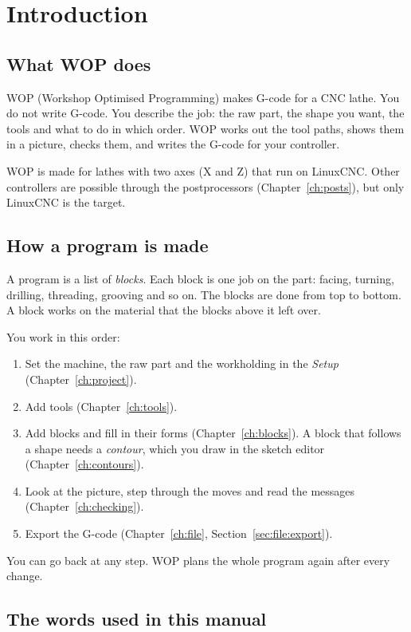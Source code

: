 \chapter{Introduction}\label{ch:introduction}

\section{What WOP does}
WOP (Workshop Optimised Programming) makes G-code for a CNC lathe. You do not write G-code. You describe the job: the raw part, the shape you want, the tools and what to do in which order. WOP works out the tool paths, shows them in a picture, checks them, and writes the G-code for your controller.

WOP is made for lathes with two axes (X and Z) that run on LinuxCNC. Other controllers are possible through the postprocessors (Chapter~\ref{ch:posts}), but only LinuxCNC is the target.

\section{How a program is made}
A program is a list of \emph{blocks}. Each block is one job on the part: facing, turning, drilling, threading, grooving and so on. The blocks are done from top to bottom. A block works on the material that the blocks above it left over.

You work in this order:
\begin{enumerate}
  \item Set the machine, the raw part and the workholding in the \emph{Setup} (Chapter~\ref{ch:project}).
  \item Add tools (Chapter~\ref{ch:tools}).
  \item Add blocks and fill in their forms (Chapter~\ref{ch:blocks}). A block that follows a shape needs a \emph{contour}, which you draw in the sketch editor (Chapter~\ref{ch:contours}).
  \item Look at the picture, step through the moves and read the messages (Chapter~\ref{ch:checking}).
  \item Export the G-code (Chapter~\ref{ch:file}, Section~\ref{sec:file:export}).
\end{enumerate}
You can go back at any step. WOP plans the whole program again after every change.

\section{The words used in this manual}
